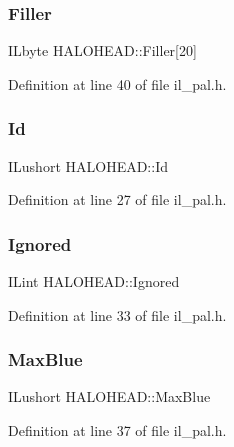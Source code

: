 \subsubsection{\texorpdfstring{Filler}{Filler}}
{\footnotesize\ttfamily I\+Lbyte H\+A\+L\+O\+H\+E\+A\+D\+::\+Filler\mbox{[}20\mbox{]}}



Definition at line 40 of file il\+\_\+pal.\+h.

\mbox{\label{structHALOHEAD_a5abb1131ad880789668d6dc2ab251854}} 
\subsubsection{\texorpdfstring{Id}{Id}}
{\footnotesize\ttfamily I\+Lushort H\+A\+L\+O\+H\+E\+A\+D\+::\+Id}



Definition at line 27 of file il\+\_\+pal.\+h.

\mbox{\label{structHALOHEAD_a7df7fd866c0f0bcd8e28182857aa7111}} 
\subsubsection{\texorpdfstring{Ignored}{Ignored}}
{\footnotesize\ttfamily I\+Lint H\+A\+L\+O\+H\+E\+A\+D\+::\+Ignored}



Definition at line 33 of file il\+\_\+pal.\+h.

\mbox{\label{structHALOHEAD_a10050e890256ba2e1df59ee46767fbcf}} 
\subsubsection{\texorpdfstring{Max\+Blue}{MaxBlue}}
{\footnotesize\ttfamily I\+Lushort H\+A\+L\+O\+H\+E\+A\+D\+::\+Max\+Blue}



Definition at line 37 of file il\+\_\+pal.\+h.

